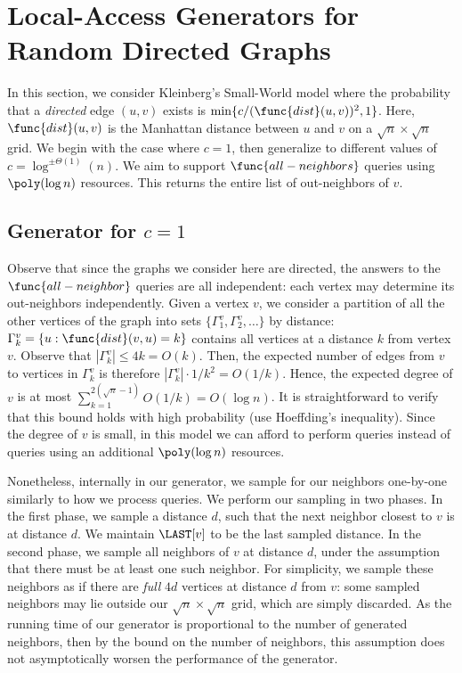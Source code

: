 \section{Local-Access Generators for Random Directed Graphs}
\label{sec:small_world}

In this section, we consider Kleinberg's Small-World model \cite{kleinberg, klein}
where the probability that a \emph{directed} edge $(u,v)$ exists is $\min\{c/(\func{dist}(u,v))^2, 1\}$.
Here, $\func{dist}(u,v)$ is the Manhattan distance between $u$ and $v$ on a $\sqrt n\times\sqrt n$ grid.
We begin with the case where $c = 1$, then generalize to different values of $c = \log^{\pm\Theta(1)}(n)$. 
We aim to support $\func{all-neighbors}$ queries using $\poly(\log n)$ resources. 
This returns the entire list of out-neighbors of $v$.

\subsection{Generator for $c=1$}

Observe that since the graphs we consider here are directed, the answers to the $\func{all-neighbor}$ queries are all independent: each vertex may determine its out-neighbors independently.
Given a vertex $v$, we consider a partition of all the other vertices of the graph into sets $\{\Gamma^v_1, \Gamma^v_2,\ldots\}$ by distance: $\Gamma^v_k = \{u: \func{dist}(v,u) = k\}$ contains all vertices at a distance $k$ from vertex $v$. Observe that $|\Gamma^v_k|\leq 4k = O(k)$. Then, the expected number of edges from $v$ to vertices in $\Gamma^v_k$ is therefore $|\Gamma^v_k|\cdot 1/k^2 = O(1/k)$.
Hence, the expected degree of $v$ is at most $\sum_{k=1}^{2(\sqrt{n}-1)}O(1/k) = O(\log n)$.
It is straightforward to verify that this bound holds with high probability (use Hoeffding's inequality).
Since the degree of $v$ is small, in this model we can afford to perform  queries instead of  queries using an additional $\poly(\log n)$ resources.

Nonetheless, internally in our generator, we sample for our neighbors one-by-one similarly to how we process  queries.
We perform our sampling in two phases.
In the first phase, we sample a distance $d$, such that the next neighbor closest to $v$ is at distance $d$.
We maintain $\LAST[v]$ to be the last sampled distance.
In the second phase, we sample all neighbors of $v$ at distance $d$, under the assumption that there must be at least one such neighbor.
For simplicity, we sample these neighbors as if there are \emph{full} $4d$ vertices at distance $d$ from $v$:
some sampled neighbors may lie outside our $\sqrt n\times\sqrt n$ grid, which are simply discarded.
As the running time of our generator is proportional to the number of generated neighbors,
then by the bound on the number of neighbors, this assumption does not asymptotically worsen the performance of the generator.

